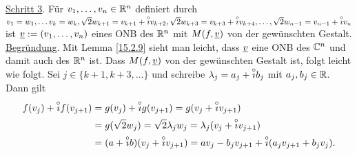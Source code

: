 \documentclass[../../main.tex]{subfiles}
\begin{document}
\begin{cproof}
\noindent\underline{Schritt 3}. Für $v_1,\ldots ,v_n\in \mathbb R^n$ definiert durch $v_1=w_1,\ldots v_k=w_k, \sqrt{2}w_{k+1}=v_{k+1}+\overset\circ\imath v_{k+2},\sqrt{2}w_{k+3}=v_{k+3}+\overset\circ\imath v_{k+4},\ldots ,\sqrt{2}w_{n-1}=v_{n-1}+\overset\circ\imath v_n$ ist ${\underline v}:=(v_1,\ldots ,v_n)$ eines ONB des $\mathbb R^n$ mit $M(f,{\underline v})$ von der gewünschten Gestalt.\\
\noindent\underline{Begründung}. Mit Lemma \ref{15.2.9} sieht man leicht, dass ${\underline v}$ eine ONB des $\mathbb C^n$ und damit auch des $\mathbb R^n$ ist. Dass $M(f,{\underline v})$ von der gewünschten Gestalt ist, folgt leicht wie folgt. Sei $j\in\{k+1,k+3,\ldots \}$ und schreibe $\lambda_j=a_j+\overset\circ\imath b_j$ mit $a_j,b_j\in \mathbb R$. Dann gilt
\begin{align*}
f(v_j)+\overset\circ\imath f(v_{j+1})&=g(v_j)+\overset\circ\imath g(v_{j+1})=g(v_j+\overset\circ\imath v_{j+1})\\
&=g(\sqrt{2}w_j)=\sqrt{2}\lambda_jw_j=\lambda_j(v_j+\overset\circ\imath v_{j+1})\\
&=(a+\overset\circ\imath b)(v_j+\overset\circ\imath v_{j+1})=av_j-b_jv_{j+1}+\overset\circ\imath(a_jv_{j+1}+b_jv_j).
\end{align*}
\end{cproof}
\end{document}
